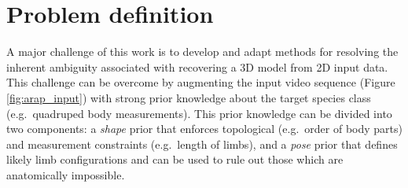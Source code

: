     \section{Problem definition}
    A major challenge of this work is to develop and adapt methods for resolving the inherent ambiguity associated with recovering a 3D model from 2D input data. This challenge can be overcome by augmenting the input video sequence (Figure \ref{fig:arap_input}) with strong prior knowledge about the target species class (e.g.\ quadruped body measurements). This prior knowledge can be divided into two components: a \emph{shape} prior that enforces topological (e.g.\ order of body parts) and measurement constraints (e.g.\ length of limbs), and a \emph{pose} prior that defines likely limb configurations and can be used to rule out those which are anatomically impossible.


